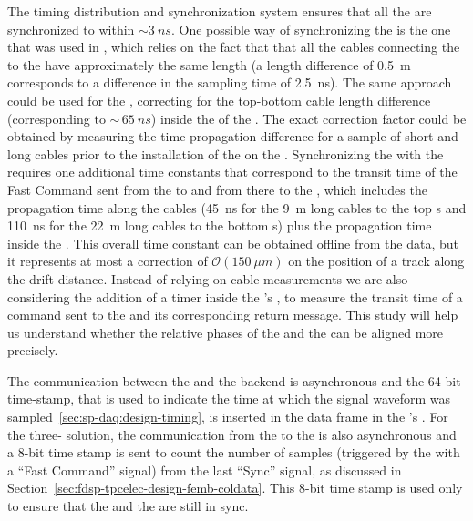 The timing distribution and synchronization system ensures that
all the  are synchronized to within $\sim\SI{3}{ns}$. 
One possible way of synchronizing the  is the one
that was used in , which relies on the fact that 
that all the cables connecting the  to the
 have approximately the same length (a length 
difference of \SI{0.5}{m} corresponds to a difference in the
sampling time of \SI{2.5}{ns}). The same approach could be used
for the  , correcting for the top-bottom 
 cable length difference (corresponding to $\sim\,\SI{65}{ns}$) 
inside the  of the . The exact correction
factor could be obtained by measuring the time propagation 
difference for a sample of short and long cables prior to the 
installation of the  on the . 
Synchronizing the  with the  requires one
additional time constants that correspond to the transit 
time of the Fast Command sent from the  to
 and from there to the ,
which includes the propagation time along the cables
(\SI{45}{ns} for the \SI{9}{m} long cables to the top s
and \SI{110}{ns} for the \SI{22}{m} long cables to the bottom s) 
plus the propagation time inside the . This overall 
time constant can be obtained offline from the data, but it represents 
at most a correction of $\mathcal{O}(\SI{150}{\mu m})$ on the 
position of a track along the drift distance.
Instead of relying on cable measurements we are also considering
the addition of a timer inside the 's ,
to measure the transit time of a command
sent to the  and its corresponding return
message. This study will help us understand whether the 
relative phases of the  and the  
can be aligned more precisely.

The communication between the  and the  
backend is asynchronous and the \num{64}-bit time-stamp, that
is used to indicate the time at which the signal waveform was
sampled~\ref{sec:sp-daq:design-timing}, is inserted in the data frame
in the 's . 
For the three- solution, the communication
from the  to the  is also
asynchronous and a \num{8}-bit time stamp is sent to
count the number of  samples (triggered by
the  with a ``Fast Command'' signal) from the last
``Sync'' signal, as discussed in Section~\ref{sec:fdsp-tpcelec-design-femb-coldata}.
This \num{8}-bit time stamp is used only to ensure
that the  and the  are
still in sync. 


